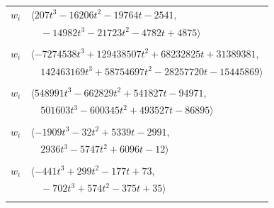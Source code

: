 \documentclass[11pt]{article}
\begin{document}
\begin{longtable}{@{}ll@{}}
$w_i$ & $\langle 207t^{3}-16206t^{2}-19764t-2541,$\\
 & $\quad -14982t^{3}-21723t^{2}-4782t+4875\rangle$\\
\addlinespace[2pt]
\multicolumn{2}{@{}p{0.97\textwidth}@{}}{$i=29$, $D_i=1048576$, $\rho_{ij}$: $1{:}2, \allowbreak 6{:}2, \allowbreak 7{:}2, \allowbreak 10{:}2, \allowbreak 24{:}2, \allowbreak 25{:}2, \allowbreak 34{:}1, \allowbreak 38{:}1, \allowbreak 39{:}2, \allowbreak 42{:}2, \allowbreak 43{:}1, \allowbreak 45{:}1, \allowbreak 48{:}2, \allowbreak 58{:}2, \allowbreak 65{:}2, \allowbreak 68{:}1, \allowbreak 71{:}1$}\\
$w_i$ & $\langle -7274538t^{3}+129438507t^{2}+68232825t+31389381,$\\
 & $\quad 142463169t^{3}+58754697t^{2}-28257720t-15445869\rangle$\\
\addlinespace[2pt]
\multicolumn{2}{@{}p{0.97\textwidth}@{}}{$i=30$, $D_i=2048$, $\rho_{ij}$: $2{:}2, \allowbreak 6{:}1, \allowbreak 9{:}2, \allowbreak 21{:}1, \allowbreak 34{:}2, \allowbreak 37{:}1, \allowbreak 39{:}2, \allowbreak 41{:}1, \allowbreak 46{:}2, \allowbreak 54{:}2, \allowbreak 55{:}1, \allowbreak 59{:}2, \allowbreak 66{:}1, \allowbreak 68{:}1$}\\
$w_i$ & $\langle 548991t^{3}-662829t^{2}+541827t-94971,$\\
 & $\quad 501603t^{3}-600345t^{2}+493527t-86895\rangle$\\
\addlinespace[2pt]
\multicolumn{2}{@{}p{0.97\textwidth}@{}}{$i=31$, $D_i=128$, $\rho_{ij}$: $7{:}1, \allowbreak 18{:}2, \allowbreak 21{:}1, \allowbreak 25{:}2, \allowbreak 37{:}2, \allowbreak 44{:}2, \allowbreak 47{:}2, \allowbreak 50{:}2, \allowbreak 64{:}1$}\\
$w_i$ & $\langle -1909t^{3}-32t^{2}+5339t-2991,$\\
 & $\quad 2936t^{3}-5747t^{2}+6096t-12\rangle$\\
\addlinespace[2pt]
\multicolumn{2}{@{}p{0.97\textwidth}@{}}{$i=32$, $D_i=64$, $\rho_{ij}$: $4{:}1, \allowbreak 18{:}2, \allowbreak 25{:}2, \allowbreak 26{:}1, \allowbreak 41{:}1, \allowbreak 42{:}2, \allowbreak 46{:}2, \allowbreak 48{:}1, \allowbreak 50{:}1, \allowbreak 75{:}1$}\\
$w_i$ & $\langle -441t^{3}+299t^{2}-177t+73,$\\
 & $\quad -702t^{3}+574t^{2}-375t+35\rangle$\\
\addlinespace[2pt]
\multicolumn{2}{@{}p{0.97\textwidth}@{}}{$i=33$, $D_i=16$, $\rho_{ij}$: $9{:}2, \allowbreak 11{:}2, \allowbreak 14{:}1, \allowbreak 16{:}1, \allowbreak 17{:}2, \allowbreak 22{:}1, \allowbreak 24{:}1, \allowbreak 46{:}2$}\\

\end{longtable}
\end{document}
